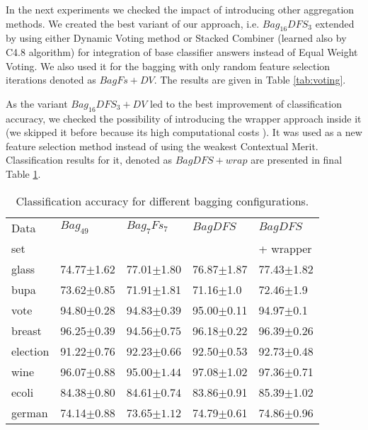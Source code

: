 \documentclass[runningheads]{llncs}
\begin{document}
In the next experiments we checked the impact of introducing other
aggregation methods. We created the best variant of our approach, i.e.
$Bag_{16}DFS_{3}$ extended by using either Dynamic Voting method or Stacked
Combiner (learned also by C4.8 algorithm) for integration of base classifier
answers instead of Equal Weight Voting. We also used it for the bagging with
only random feature selection iterations denoted as $BagFs+DV$. The results
are given in Table \ref{tab:voting}.

As the variant $Bag_{16}DFS_{3}+DV$ led to the best improvement of
classification accuracy, we checked the possibility of introducing the
wrapper approach inside it (we skipped it before because its high
computational costs \cite{Stef04}). It was used as a new feature selection
method instead of using the weakest Contextual Merit. Classification results
for it, denoted as $BagDFS+wrap$ are presented in final Table
\ref{tab:bagfinal}.

\begin{table}
  \centering
\caption{Classification accuracy for different bagging configurations.
\label{tab:bagfinal}} \vspace{2pt}
\begin{tabular}{lllll}\hline
Data  & $Bag_{49}$ &  $Bag_7Fs_7$ & $BagDFS$ & $BagDFS$ \\
set &  &  & & +
wrapper \\ \hline glass & 74.77\scriptsize{$\pm$1.62} &
77.01\scriptsize{$\pm$1.80} & 76.87\scriptsize{$\pm$1.87} &
77.43\scriptsize{$\pm$1.82}\\ bupa & 73.62\scriptsize{$\pm$0.85}&
71.91\scriptsize{$\pm$1.81} & 71.16\scriptsize{$\pm$1.0} &
72.46\scriptsize{$\pm$1.9}\\
 vote & 94.80\scriptsize${\pm0.28}$&  94.83\scriptsize${\pm0.39}$ & 95.00\scriptsize{$\pm$0.11} & 94.97\scriptsize{$\pm$0.1}\\
breast & 96.25\scriptsize${\pm0.39}$ & 94.56\scriptsize${\pm0.75}$ &
96.18\scriptsize{$\pm$0.22}& 96.39\scriptsize{$\pm$0.26}\\
election & 91.22\scriptsize${\pm0.76}$ & 92.23\scriptsize${\pm0.66}$ &
92.50\scriptsize{$\pm$0.53} & 92.73\scriptsize{$\pm$0.48}\\
 wine & 96.07\scriptsize${\pm0.88}$  &95.00\scriptsize${\pm1.44}$ & 97.08\scriptsize{$\pm$1.02}& 97.36\scriptsize{$\pm$0.71} \\
ecoli & 84.38\scriptsize${\pm0.80}$ & 84.61\scriptsize${\pm0.74}$ &
83.86\scriptsize{$\pm$0.91} & 85.39\scriptsize{$\pm$1.02}\\
german & 74.14\scriptsize${\pm0.88}$ & 73.65\scriptsize${\pm1.12}$ &
74.79\scriptsize{$\pm$0.61} & 74.86\scriptsize{$\pm$0.96}\\\hline
\end{tabular}
\end{table}
\end{document}
